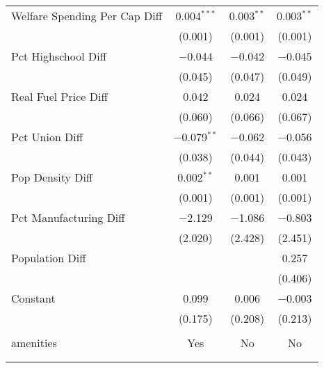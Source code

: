 \begin{table}[!htbp]
\begin{tabular}{@{\extracolsep{5pt}}lccc}
  Welfare Spending Per Cap Diff & 0.004$^{***}$ & 0.003$^{**}$ & 0.003$^{**}$ \\ 
  & (0.001) & (0.001) & (0.001) \\ 
  Pct Highschool Diff & $-$0.044 & $-$0.042 & $-$0.045 \\ 
  & (0.045) & (0.047) & (0.049) \\ 
  Real Fuel Price Diff & 0.042 & 0.024 & 0.024 \\ 
  & (0.060) & (0.066) & (0.067) \\ 
  Pct Union Diff & $-$0.079$^{**}$ & $-$0.062 & $-$0.056 \\ 
  & (0.038) & (0.044) & (0.043) \\ 
  Pop Density Diff & 0.002$^{**}$ & 0.001 & 0.001 \\ 
  & (0.001) & (0.001) & (0.001) \\ 
  Pct Manufacturing Diff & $-$2.129 & $-$1.086 & $-$0.803 \\ 
  & (2.020) & (2.428) & (2.451) \\ 
  Population Diff &  &  & 0.257 \\ 
  &  &  & (0.406) \\ 
  Constant & 0.099 & 0.006 & $-$0.003 \\ 
  & (0.175) & (0.208) & (0.213) \\ 
 \hline \\[-1.8ex] 
amenities & Yes & No & No \\ 
\hline \\[-1.8ex] 
\hline 
\hline \\[-1.8ex] 
\end{tabular} 
\end{table} 
